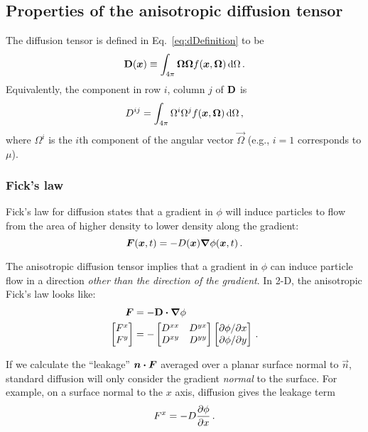 \subsection{Properties of the anisotropic diffusion tensor}
The diffusion tensor is defined in Eq.~\eqref{eq:dDefinition} to be
\begin{equation*}
  \mathbf{D}(\bm{x}) \equiv \int_{4\pi} \bm{\Omega} \bm{\Omega}
  f(\bm{x}, \bm{\Omega}) \mathop{}\!\mathrm{d}\Omega \,.
\end{equation*}
Equivalently, the component in row $i$, column $j$ of $\mathbf{D}$ is
\begin{equation}\label{eq:dij}
  D^{ij} = \int_{4\pi} \Omega^i \Omega^j
  f(\bm{x}, \bm{\Omega}) \mathop{}\!\mathrm{d}\Omega \,,
\end{equation}
where $\Omega^i$ is the $i$th component of the angular vector $\vec{\Omega}$
(e.g., $i=1$ corresponds to $\mu$).

\subsubsection{Fick's law}
Fick's law for diffusion states that a gradient in $\phi$ will induce particles
to flow from the area of higher density to lower density along the gradient:
\begin{equation*}
  \bm{F}(\bm{x},t) = - D(\bm{x}) \bm{\nabla} \phi(\bm{x},t)\,.
\end{equation*}

The anisotropic diffusion tensor implies that a gradient in $\phi$ can induce
particle flow in a direction \emph{other than the direction of the gradient}. In
2-D, the anisotropic Fick's law looks like:
\begin{align*}
  \bm{F} &= - \mathbf{D} \bm{\cdot} \bm{\nabla} \phi
  \\
  \begin{bmatrix}
    F^x \\
    F^y
  \end{bmatrix}
  &=
  -
  \begin{bmatrix}
    D^{xx} & D^{yx} \\
    D^{xy} & D^{yy}
  \end{bmatrix}
  \begin{bmatrix}
    {\partial \phi}/{\partial x} \\
    {\partial \phi}/{\partial y}
  \end{bmatrix} \,.
\end{align*}

If we calculate the ``leakage'' $\bm{n} \bm{\cdot} \bm{F}$ averaged over a planar
surface normal to $\vec{n}$, standard diffusion will only consider the gradient
\emph{normal} to the surface. For example, on a surface normal to the $x$ axis,
diffusion gives the leakage term
\begin{equation*}
  F^x = - D \frac{\partial \phi}{\partial x}\,.
\end{equation*}

